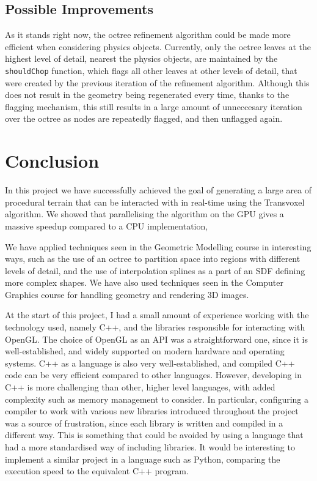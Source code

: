 \documentclass{article}
\begin{document}
\subsection{Possible Improvements}
As it stands right now, the octree refinement algorithm could be made more efficient when considering physics objects. Currently, only the octree leaves at the highest level of detail, nearest the physics objects, are maintained by the \texttt{shouldChop} function, which flags all other leaves at other levels of detail, that were created by the previous iteration of the refinement algorithm. Although this does not result in the geometry being regenerated every time, thanks to the flagging mechanism, this still results in a large amount of unneccesary iteration over the octree as nodes are repeatedly flagged, and then unflagged again.
  
\section{Conclusion}
In this project we have successfully achieved the goal of generating a large area of procedural terrain that can be interacted with in real-time using the Transvoxel algorithm. We showed that parallelising the algorithm on the GPU gives a massive speedup compared to a CPU implementation, 

We have applied techniques seen in the Geometric Modelling course in interesting ways, such as the use of an octree to partition space into regions with different levels of detail, and the use of interpolation splines as a part of an SDF defining more complex shapes. We have also used techniques seen in the Computer Graphics course for handling geometry and rendering 3D images.

At the start of this project, I had a small amount of experience working with the technology used, namely C++, and the libraries responsible for interacting with OpenGL. The choice of OpenGL as an API was a straightforward one, since it is well-established, and widely supported on modern hardware and operating systems. C++ as a language is also very well-established, and compiled C++ code can be very efficient compared to other languages. However, developing in C++ is more challenging than other, higher level languages, with added complexity such as memory management to consider. In particular, configuring a compiler to work with various new libraries introduced throughout the project was a source of frustration, since each library is written and compiled in a different way. This is something that could be avoided by using a language that had a more standardised way of including libraries. It would be interesting to implement a similar project in a language such as Python, comparing the execution speed to the equivalent C++ program.
\end{document}
